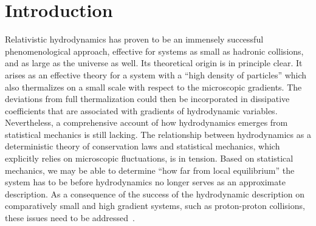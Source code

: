\documentclass[12pt,onecolumn,showpacs,amssymb,aps,nofootinbib,floatfix]{revtex4-2}
\begin{document}
	\section{Introduction}
	Relativistic hydrodynamics has proven to be an immensely successful phenomenological approach, effective for systems as small as hadronic collisions, and as large as the universe as well. Its theoretical origin is in principle clear. It arises as an effective theory for a system with a ``high density of particles'' which also thermalizes on a small scale with respect to the microscopic gradients.
	The deviations from full thermalization could then be incorporated in dissipative coefficients that are associated with gradients of hydrodynamic variables. Nevertheless, a comprehensive account of how hydrodynamics emerges from statistical mechanics is still lacking.
	The relationship between hydrodynamics as a deterministic theory of conservation laws and statistical mechanics, which explicitly relies on microscopic fluctuations, is in tension. Based on statistical mechanics, we may be able to determine ``how far from local equilibrium'' the system has to be before hydrodynamics no longer serves as an approximate description.
	As a consequence of the success of the hydrodynamic description on comparatively small and high gradient systems, such as proton-proton collisions, these issues need to be addressed~\cite{zajc, kodama, crooks}.
	
\end{document}
